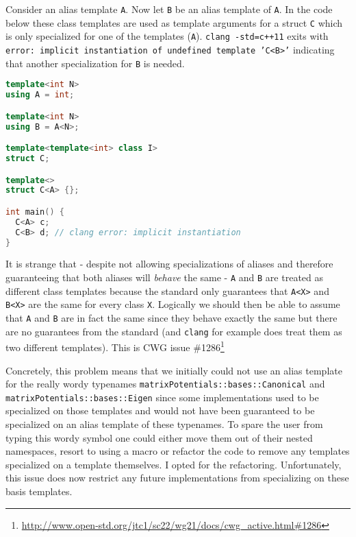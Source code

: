 Consider an alias template \texttt{A}. Now let \texttt{B} be an alias template of \texttt{A}.
In the code below these class templates are used as template arguments for a struct \texttt{C} which is only specialized for one of the templates (\texttt{A}). \texttt{clang -std=c++11} exits with \texttt{error: implicit instantiation of undefined template 'C<B>'} indicating that another specialization for \texttt{B} is needed.
\begin{lstlisting}[language=C++]
template<int N>
using A = int;

template<int N>
using B = A<N>;

template<template<int> class I>
struct C;

template<>
struct C<A> {};

int main() {
  C<A> c;
  C<B> d; // clang error: implicit instantiation
}
\end{lstlisting}
It is strange that - despite not allowing specializations of aliases and therefore guaranteeing that both aliases will \textit{behave} the same - \texttt{A} and \texttt{B} are treated as different class templates because the standard only guarantees that \texttt{A<X>} and \texttt{B<X>} are the same for every class \texttt{X}. Logically we should then be able to assume that \texttt{A} and \texttt{B} are in fact the same since they behave exactly the same but there are no guarantees from the standard (and \texttt{clang} for example does treat them as two different templates). This is CWG issue \#1286\footnote{\url{http://www.open-std.org/jtc1/sc22/wg21/docs/cwg_active.html\#1286}}

Concretely, this problem means that we initially could not use an alias template for the really wordy typenames \texttt{matrixPotentials::bases::Canonical} and \texttt{matrixPotentials::bases::Eigen} since some implementations used to be specialized on those templates and would not have been guaranteed to be specialized on an alias template of these typenames. To spare the user from typing this wordy symbol one could either move them out of their nested namespaces, resort to using a macro or refactor the code to remove any templates specialized on a template themselves. I opted for the refactoring. Unfortunately, this issue does now restrict any future implementations from specializing on these basis templates.


